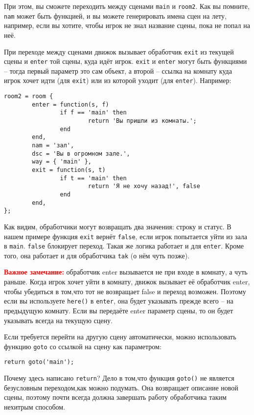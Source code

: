 \documentclass[a4paper,12pt]{article}
\begin{document}
При этом, вы сможете переходить между сценами \verb/main/ и \verb/room2/. Как вы помните, \verb/nam/ может быть функцией, и вы можете генерировать имена сцен на лету, например, если вы хотите, чтобы игрок не знал название сцены, пока не попал на неё.

При переходе между сценами движок вызывает обработчик \verb/exit/ из текущей сцены и \verb/enter/ той сцены, куда идёт игрок. \verb/exit/ и \verb/enter/ могут быть функциями -- тогда первый параметр это сам объект, а второй -- ссылка на комнату куда игрок хочет идти (для \verb/exit/) или из которой уходит (для \verb/enter/). Например:

\begin{verbatim}
room2 = room {
        enter = function(s, f)
                if f == 'main' then
                        return 'Вы пришли из комнаты.';
                end
        end,
        nam = 'зал',
        dsc = 'Вы в огромном зале.',
        way = { 'main' },
        exit = function(s, t)
                if t == 'main' then
                        return 'Я не хочу назад!', false
                end
        end,
};
\end{verbatim}

Как видим, обработчики могут возвращать два значения: строку и статус. В нашем примере функция \verb/exit/ вернёт \verb/false/, если игрок попытается уйти из зала в \verb/main/. \verb/false/ блокирует переход. Такая же логика работает и для \verb/enter/. Кроме того, она работает и для обработчика \verb/tak/ (о нём чуть позже).

\textbf{\textcolor{red}{Важное замечание:}} обработчик enter вызывается не при входе в комнату, а чуть раньше. Когда игрок хочет уйти в комнату, движок вызывает её обработчик enter, чтобы убедиться в том,что тот не возвращает false и переход возможен. Поэтому если вы используете \verb/here()/ в \verb/enter/, она будет указывать прежде всего -- на предыдущую комнату. Если вы передаёте enter параметр сцены, то он будет указывать всегда на текущую сцену.

Если требуется перейти на другую сцену автоматически, можно использовать функцию \verb/goto/ со ссылкой на сцену как параметром:

\begin{verbatim}
return goto('main');
\end{verbatim}

Почему здесь написано \verb/return/? Дело в том,что функция \verb/goto()/ не является безусловным переходом,как можно подумать. Она возвращает описание новой сцены, поэтому почти всегда должна завершать работу обработчика таким нехитрым способом.
\end{document}
